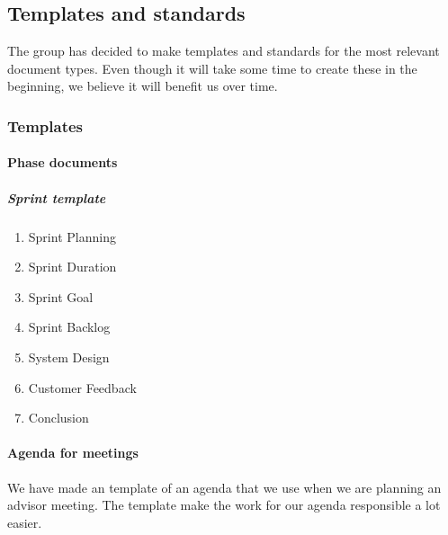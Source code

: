 \subsection{Templates and standards}
The group has decided to make templates and standards for the most relevant document types. Even though it will take some time to create these in the beginning, we believe it will benefit us over time.

\subsubsection{Templates}

\paragraph{Phase documents}

\subparagraph{Sprint template}\hfill
\begin{enumerate}
\item{}Sprint Planning
\item{}Sprint Duration
\item{}Sprint Goal
\item{}Sprint Backlog
\item{}System Design
\item{}Customer Feedback
\item{}Conclusion
\end{enumerate}

\paragraph{Agenda for meetings}
We have made an template of an agenda that we use when we are planning an advisor meeting. The template make the work for our agenda responsible a lot easier.

